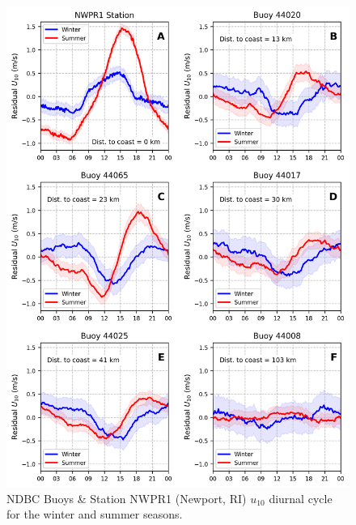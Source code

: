 \begin{figure}[H]
\centering
\includegraphics[width=1.\linewidth]{Figures/Chapter5/wind_diurnal_variability_residuals11.png}
\caption{NDBC Buoys \& Station NWPR1 (Newport, RI) $u_{10}$ diurnal cycle for the winter and summer seasons.}
\label{fig:wind_diur_variability}
\end{figure}



